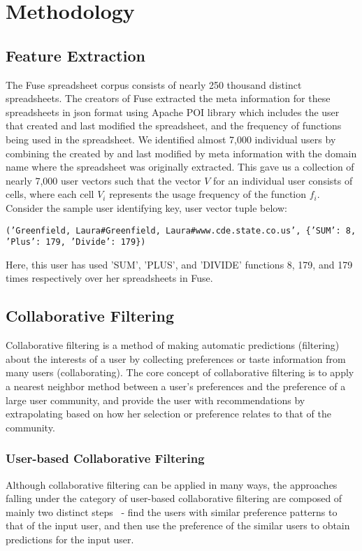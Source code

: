 \documentclass{article} %
\begin{document}
\section{Methodology}
\subsection{Feature Extraction}
The Fuse spreadsheet corpus consists of nearly 250 thousand distinct spreadsheets. The creators of Fuse extracted the meta information for these spreadsheets in json format using Apache POI library which includes the user that created and last modified the spreadsheet, and the frequency of functions being used in the spreadsheet. We identified almost 7,000 individual users by combining the created by and last modified by meta information with the domain name where the spreadsheet was originally extracted. This gave us a collection of nearly 7,000 user vectors such that the vector $V$ for an individual user consists of cells, where each cell $V_i$ represents the usage frequency of the function $f_i$. Consider the sample user identifying key, user vector tuple below:
\begin{center}
   \texttt{('Greenfield, Laura\#Greenfield, Laura\#www.cde.state.co.us', \{'SUM': 8, 'Plus': 179, 'Divide': 179\})}
\end{center}
Here, this user has used 'SUM', 'PLUS', and 'DIVIDE' functions 8, 179, and 179 times respectively over her spreadsheets in Fuse.

\subsection{Collaborative Filtering}
Collaborative filtering is a method of making automatic predictions (filtering) about the interests of a user by collecting preferences or taste information from many users (collaborating). The core concept of collaborative filtering is to apply a nearest neighbor method between a user's preferences and the preference of a large user community, and provide the user with recommendations by extrapolating based on how her selection or preference relates to that of the community.

\subsubsection{User-based Collaborative Filtering}
Although collaborative filtering can be applied in many ways, the approaches falling under the category of user-based collaborative filtering are composed of mainly two distinct steps~\cite{breese1998empirical} - find the users with similar preference patterns to that of the input user, and then use the preference of the similar users to obtain predictions for the input user.
\end{document}
